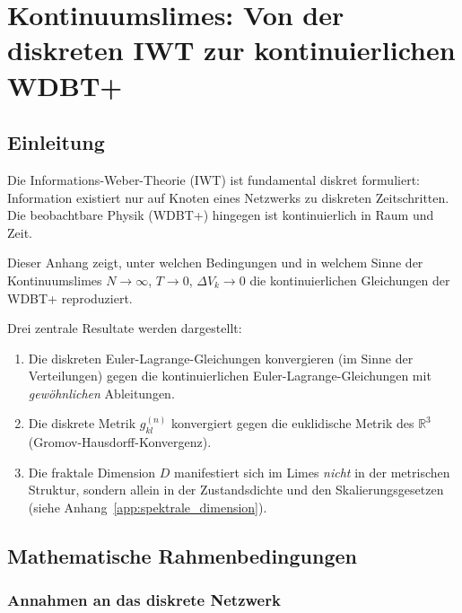 
\chapter{Kontinuumslimes: Von der diskreten IWT zur kontinuierlichen WDBT+}
\label{app:kontinuumslimes}

\section{Einleitung}
\label{app:kontinuumslimes_einleitung}

Die Informations-Weber-Theorie (IWT) ist fundamental diskret formuliert: Information existiert
nur auf Knoten eines Netzwerks zu diskreten Zeitschritten. Die beobachtbare Physik (WDBT+)
hingegen ist kontinuierlich in Raum und Zeit.

Dieser Anhang zeigt, unter welchen Bedingungen und in welchem Sinne der Kontinuumslimes
\( N \to \infty \), \( T \to 0 \), \( \Delta V_k \to 0 \) die kontinuierlichen Gleichungen der
WDBT+ reproduziert.

Drei zentrale Resultate werden dargestellt:

\begin{enumerate}
    \item Die diskreten Euler-Lagrange-Gleichungen konvergieren (im Sinne der Verteilungen)
          gegen die kontinuierlichen Euler-Lagrange-Gleichungen mit \emph{gewöhnlichen}
          Ableitungen.
    \item Die diskrete Metrik \( g_{kl}^{(n)} \) konvergiert gegen die euklidische Metrik
          des \( \mathbb{R}^3 \) (Gromov-Hausdorff-Konvergenz).
    \item Die fraktale Dimension \( D \) manifestiert sich im Limes \emph{nicht} in der
          metrischen Struktur, sondern allein in der Zustandsdichte und den
          Skalierungsgesetzen (siehe Anhang~\ref{app:spektrale_dimension}).
\end{enumerate}

\section{Mathematische Rahmenbedingungen}
\label{app:kontinuumslimes_rahmen}

\subsection{Annahmen an das diskrete Netzwerk}
\label{sub:kontinuumslimes_annahmen}

